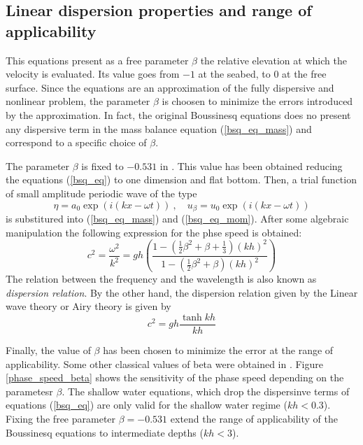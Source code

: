 \subsection{Linear dispersion properties and range of applicability}

This equations present as a free parameter $\beta$ the relative elevation at which the velocity is evaluated. Its value goes from $-1$ at the seabed, to $0$ at the free surface. Since the equations are an approximation of the fully dispersive and nonlinear problem, the parameter $\beta$ is choosen to minimize the errors introduced by the approximation.
In fact, the original Boussinesq equations does no present any dispersive term in the mass balance equation (\ref{bsq_eq_mass}) and correspond to a specific choice of $\beta$.

The parameter $\beta$ is fixed to $-0.531$ in \cite{nwogu1993}. This value has been obtained reducing the equations (\ref{bsq_eq}) to one dimension and flat bottom. Then, a trial function of small amplitude periodic wave of the type
\begin{equation*}
    \eta = a_0 \exp(i(kx-\omega t)) \ , \quad u_\beta = u_0 \exp(i(kx-\omega t))
\end{equation*}
is substitured into (\ref{bsq_eq_mass}) and (\ref{bsq_eq_mom}). After some algebraic manipulation the following expression for the phse speed is obtained:
\begin{equation}
c^2 = \frac{\omega^2}{k^2} = gh
    \left(\frac{
        1-\left(\frac{1}{2}\beta^2 + \beta + \frac{1}{3}\right)(kh)^2
    }{
        1-\left(\frac{1}{2}\beta^2 + \beta\right)(kh)^2
    }\right)
\end{equation}
The relation between the frequency and the wavelength is also known as \emph{dispersion relation}.
By the other hand, the dispersion relation given by the Linear wave theory or Airy theory is given by
\begin{equation}
c^2 = gh \frac{\tanh kh}{kh}
\end{equation}

Finally, the value of $\beta$ has been chosen to minimize the error at the range of applicability. Some other classical values of beta were obtained in \cite{madsen1991,murray1989}. Figure \ref{phase_speed_beta} shows the sensitivity of the phase speed depending on the parametesr $\beta$. The shallow water equations, which drop the dispersinve terms of equations (\ref{bsq_eq}) are only valid for the shallow water regime ($kh<0.3$). Fixing the free parameter $\beta=-0.531$ extend the range of applicability of the Boussinesq equations to intermediate depths ($kh<3$).

